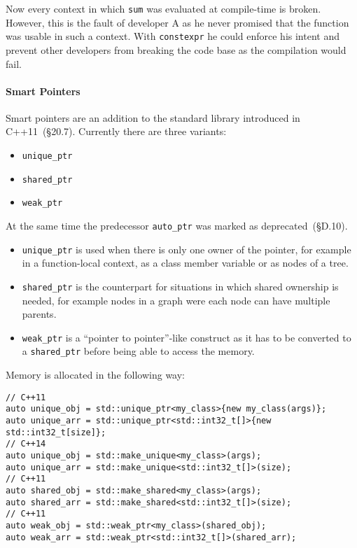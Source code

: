 Now every context in which \texttt{sum} was evaluated at compile-time is broken. However, this is the fault of developer A as he never promised that the function was usable in such a context. With \texttt{constexpr} he could enforce his intent and prevent other developers from breaking the code base as the compilation would fail.

\paragraph{Smart Pointers}\label{vec_add:smart_ptr}

Smart pointers are an addition to the standard library introduced in C++11~\cite{cpp11std}(§20.7). Currently there are three variants:
\begin{itemize}
\item \texttt{unique\_ptr}
\item \texttt{shared\_ptr}
\item \texttt{weak\_ptr}
\end{itemize}

At the same time the predecessor \texttt{auto\_ptr} was marked as deprecated~\cite{cpp11std}(§D.10).
\begin{itemize}
\item \texttt{unique\_ptr} is used when there is only one owner of the pointer, for example in a function-local context, as a class member variable or as nodes of a tree.

\item \texttt{shared\_ptr} is the counterpart for situations in which shared ownership is needed, for example nodes in a graph were each node can have multiple parents.

\item \texttt{weak\_ptr} is a ``pointer to pointer''-like construct as it has to be converted to a \texttt{shared\_ptr} before being able to access the memory.
\end{itemize}

Memory is allocated in the following way:
\begin{lstlisting}
// C++11
auto unique_obj = std::unique_ptr<my_class>{new my_class(args)};
auto unique_arr = std::unique_ptr<std::int32_t[]>{new std::int32_t[size]};
// C++14
auto unique_obj = std::make_unique<my_class>(args);
auto unique_arr = std::make_unique<std::int32_t[]>(size);
// C++11
auto shared_obj = std::make_shared<my_class>(args);
auto shared_arr = std::make_shared<std::int32_t[]>(size);
// C++11
auto weak_obj = std::weak_ptr<my_class>(shared_obj);
auto weak_arr = std::weak_ptr<std::int32_t[]>(shared_arr);
\end{lstlisting}


